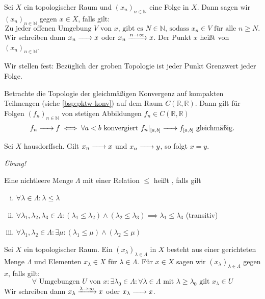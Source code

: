 \begin{definition}[{name=[Konvergenz und Grenzwerte]}]
	Sei $X$ ein topologischer Raum und $(x_n)_{n \in \mathbb{N}}$ eine Folge in $X$.
	Dann sagen wir $(x_n)_{n \in \mathbb{N} }$  gegen $x \in X$, falls gilt:
	\[
		\text{Zu jeder offenen Umgebung $V$ von $x$, gibt es $N \in \mathbb{N}$, sodass $x_n \in V$ für alle $n \ge N$.}
	\]
	Wir schreiben dann $x_n \grenzw{} x$ oder $x_n \grenzwIn{n \to \infty} x$.
	Der Punkt $x$ heißt  von $(x_n)_{n \in \mathbb{N}}$.
\end{definition}

Wir stellen fest: Bezüglich der groben Topologie ist jeder Punkt Grenzwert jeder Folge.

Betrachte die Topologie der gleichmäßigen Konvergenz auf kompakten Teilmengen (siehe \cref{bsp:pktw-konv}) auf dem Raum $C(\mathbb{R},\mathbb{R})$.
Dann gilt für Folgen $(f_n)_{n \in \mathbb{N} }$ von stetigen Abbildungen $f_n \in C(\mathbb{R},\mathbb{R})$
\[
	f_n \grenzw{} f \iff \forall a < b \text{ konvergiert } f_n|_{[a,b]} \grenzw{} f_{[a,b]} \text{ gleichmäßig.}
\]

\begin{lemma}[{name=[Eindeutigkeit von Grenzwerten]}]
	Sei $X$ hausdorffsch. Gilt $x_n \grenzw{} x$ und $x_n \grenzw{} y$, so folgt $x=y$.
\end{lemma}
\begin{beweis}
	\emph{Übung!}
\end{beweis}

\begin{definition}[{name=[gerichtete Menge]}]
	Eine nichtleere Menge $\Lambda$ mit einer Relation $\le$ heißt , falls gilt
	\begin{enumerate}[(i)]
		\item $\forall \lambda  \in \Lambda : \lambda  \le \lambda $
		\item $\forall \lambda_1, \lambda_2, \lambda_3 \in \Lambda  : (\lambda_1 \le \lambda_2) \wedge (\lambda_2 \le \lambda_3) \implies \lambda_1 \le \lambda_3$
		\hfill (transitiv)
		\item $\forall \lambda_1, \lambda_2 \in \Lambda : \exists \mu : (\lambda_1 \le \mu) \wedge (\lambda_2 \le \mu)$
	\end{enumerate}
\end{definition}

\begin{definition}[{name=[Konvergenz von Netzen]}]
	Sei $X$ ein topologischer Raum.
	Ein  $(x_\lambda)_{\lambda \in \Lambda }$ in $X$ besteht aus einer gerichteten Menge $\Lambda $ und Elementen $x_\lambda \in X$ für $\lambda \in \Lambda $.
	Für $x \in X$ sagen wir $(x_\lambda )_{\lambda \in \Lambda }$  gegen $x$, falls gilt:
	\[
		\forall \text{ Umgebungen } U \text{ von } x : \exists \lambda_0 \in \Lambda : \forall \lambda \in \Lambda \text{ mit }
		\lambda \ge \lambda_0 \text{ gilt } x_\lambda \in U
	\]
	Wir schreiben dann $x_\lambda \grenzwIn{\lambda  \to \infty} x$ oder $x_\lambda \grenzw{} x$.
\end{definition}

